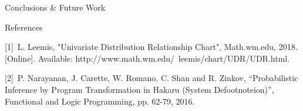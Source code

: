 \documentclass[22pt]{beamer}
\begin{document}
\begin{frame}[fragile]
\begin{textblock}{5}
\begin{block}{\Large{Conclusions \& Future Work}}
{}

\end{block}


\begin{block}{\Large{References}}

\footnotesize{[1]~L. Leemis, "Univariate Distribution Relationship Chart", Math.wm.edu, 2018. [Online]. Available: http://www.math.wm.edu/~leemis/chart/UDR/UDR.html. 

[2]~P. Narayanan, J. Carette, W. Romano, C. Shan and R. Zinkov, “Probabilistic Inference by Program Transformation in Hakaru (System Defootnoteion)”, Functional and Logic Programming, pp. 62-79, 2016.}


\end{block}


% 

\end{textblock}
\end{frame}
\end{document}
